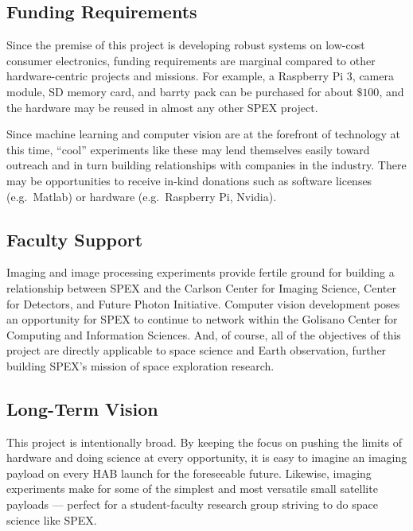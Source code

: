 \documentclass[conference]{IEEEtran} %
\begin{document}
\subsection{Funding Requirements}
Since the premise of this project is developing robust systems on low-cost consumer electronics, funding requirements are marginal compared to other hardware-centric projects and missions.
For example, a Raspberry Pi 3, camera module, SD memory card, and barrty pack can be purchased for about $\$100$, and the hardware may be reused in almost any other SPEX project.

Since machine learning and computer vision are at the forefront of technology at this time, ``cool'' experiments like these may lend themselves easily toward outreach and in turn building relationships with companies in the industry.
There may be opportunities to receive in-kind donations such as software licenses (e.g.~Matlab) or hardware (e.g.~Raspberry Pi, Nvidia).

\subsection{Faculty Support}
Imaging and image processing experiments provide fertile ground for building a relationship between SPEX and the Carlson Center for Imaging Science, Center for Detectors, and Future Photon Initiative.
Computer vision development poses an opportunity for SPEX to continue to network within the Golisano Center for Computing and Information Sciences.
And, of course, all of the objectives of this project are directly applicable to space science and Earth observation, further building SPEX's mission of space exploration research.

\subsection{Long-Term Vision}
\label{sec:vision}
This project is intentionally broad.
By keeping the focus on pushing the limits of hardware and doing science at every opportunity, it is easy to imagine an imaging payload on every HAB launch for the foreseeable future.
Likewise, imaging experiments make for some of the simplest and most versatile small satellite payloads --- perfect for a student-faculty research group striving to do space science like SPEX.
\end{document}
